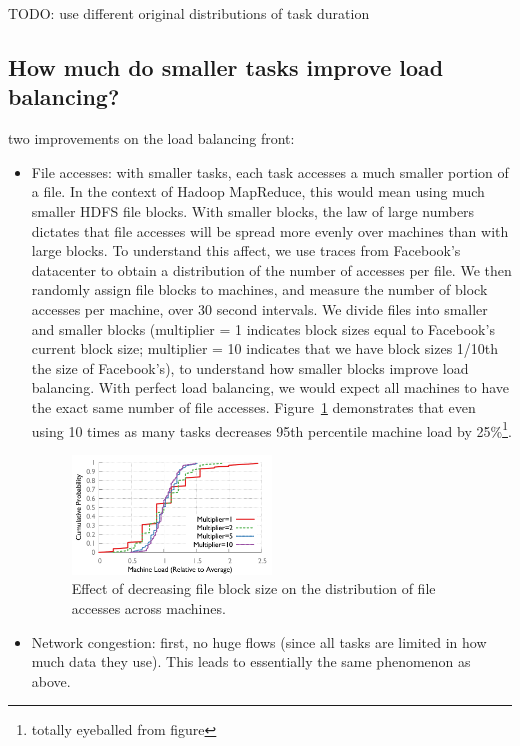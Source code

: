 TODO: use different original distributions of task duration

\subsection{How much do smaller tasks improve load balancing?}
two improvements on the load balancing front:
\begin{itemize}
\item File accesses: with smaller tasks, each task accesses a much smaller portion of a file.  In the context of Hadoop MapReduce, this would mean using much smaller HDFS file blocks.  With smaller blocks, the law of large numbers dictates that file accesses will be spread more evenly over machines than with large blocks.  To understand this affect, we use traces from Facebook's datacenter to obtain a distribution of the number of accesses per file.  We then randomly assign file blocks to machines, and measure the number of block accesses per machine, over 30 second intervals.  We divide files into smaller and smaller blocks (multiplier = 1 indicates block sizes equal to Facebook's current block size; multiplier = 10 indicates that we have block sizes 1/10th the size of Facebook's), to understand how smaller blocks improve load balancing.  With perfect load balancing, we would expect all machines to have the exact same number of file accesses.  Figure~\ref{fig:data_skew} demonstrates that even using 10 times as many tasks decreases 95th percentile machine load by 25\%\footnote{totally eyeballed from figure}.  

\begin{figure}[t]
\centering
\hspace{2ex}
\includegraphics[width=0.5\textwidth]{figures/skew_results}
\vspace{-4ex}
\caption{Effect of decreasing file block size on the distribution of file accesses across machines.}
\vspace{-2ex}
\label{fig:data_skew}
\end{figure}

\item Network congestion: first, no huge flows (since all tasks are limited in how much data they use). This leads to essentially the same phenomenon as above.
\end{itemize}

